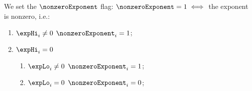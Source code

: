 We set the $\nonzeroExponent$ flag: $\nonzeroExponent = 1 \iff$ the exponent is nonzero, i.e.:
\begin{enumerate}
	\item \If $\expHi_{i} \neq 0$ \Then $\nonzeroExponent_{i} = 1$;
	\item \If $\expHi_{i} =    0$ \Then
	\begin{enumerate}
		\item \If $\expLo_{i} \neq 0$ \Then $\nonzeroExponent_{i} = 1$;
		\item \If $\expLo_{i} =    0$ \Then $\nonzeroExponent_{i} = 0$;
	\end{enumerate}
\end{enumerate}
